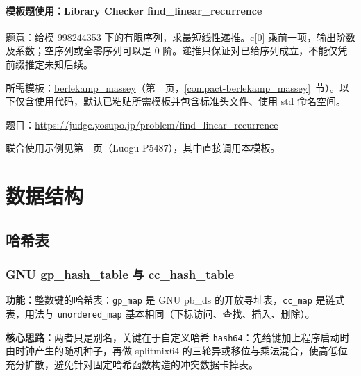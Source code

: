 \subsection*{模板题使用：Library Checker find\_linear\_recurrence}

\label{usage-example-81}

题意：给模 998244353 下的有限序列，求最短线性递推。c[0] 乘前一项，输出阶数及系数；空序列或全零序列可以是 0 阶。递推只保证对已给序列成立，不能仅凭前缀推定未知后续。

所需模板：\hyperref[compact-berlekamp_massey]{berlekamp\_\allowbreak{}massey}（第~\pageref{compact-berlekamp_massey}~页，\ref{compact-berlekamp_massey}~节）。以下仅含使用代码，默认已粘贴所需模板并包含标准头文件、使用 std 命名空间。

题目：\url{https://judge.yosupo.jp/problem/find_linear_recurrence}



联合使用示例见第~\pageref{usage-example-160}~页（Luogu P5487），其中直接调用本模板。

\part{数据结构}

\Needspace{485pt}

\chapter{哈希表}

\section{GNU gp\_hash\_table 与 cc\_hash\_table}\label{compact-gp_map}

\noindent\textbf{功能：}\allowbreak 整数键的哈希表：\texttt{gp\_map} 是 GNU pb\_ds 的开放寻址表，\texttt{cc\_map} 是链式表，用法与 \texttt{unordered\_map} 基本相同（下标访问、查找、插入、删除）。

\textbf{核心思路：}\allowbreak 两者只是别名，关键在于自定义哈希 \texttt{hash64}：先给键加上程序启动时由时钟产生的随机种子，再做 splitmix64 的三轮异或移位与乘法混合，使高低位充分扩散，避免针对固定哈希函数构造的冲突数据卡掉表。



